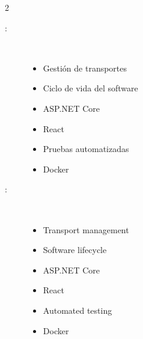 \begin{multicols}{2}
\begin{description}
\item [\palabraschaveprincipal:] \mbox{} \\[-20pt]
  \begin{itemize}
    \item Gestión de transportes
    \item Ciclo de vida del software
    \item ASP.NET Core
    \item React
    \item Pruebas automatizadas
    \item Docker
  \end{itemize}
\end{description}
\begin{description}
\item [\palabraschavesecundaria:] \mbox{} \\[-20pt]
  \begin{itemize}
    \item Transport management
    \item Software lifecycle
    \item ASP.NET Core
    \item React
    \item Automated testing
    \item Docker
  \end{itemize}
\end{description}
\end{multicols}
